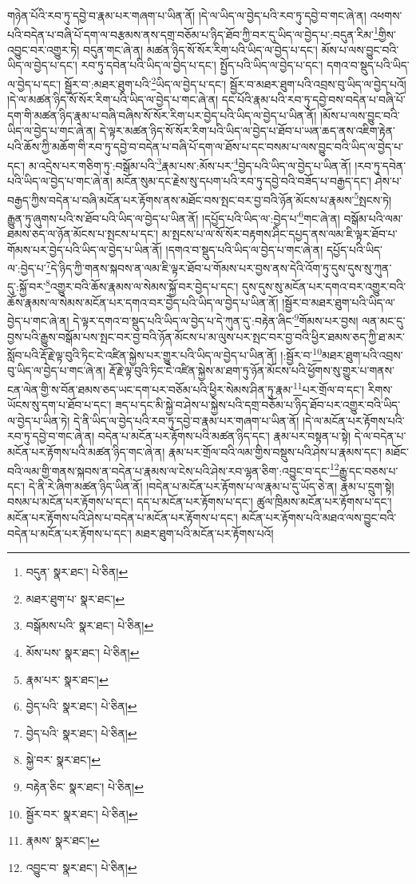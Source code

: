 གཉེན་པོའི་རབ་ཏུ་དབྱེ་བ་རྣམ་པར་གཞག་པ་ཡིན་ནོ། །དེ་ལ་ཡིད་ལ་བྱེད་པའི་རབ་ཏུ་དབྱེ་བ་གང་ཞེ་ན། འཕགས་པའི་བདེན་པ་བཞི་པོ་དག་ལ་བརྩམས་ནས་དགྲ་བཅོམ་པ་ཉིད་ཐོབ་ཀྱི་བར་དུ་ཡིད་ལ་བྱེད་པ་:བདུན་རིམ་\footnote{བདུན་  སྣར་ཐང་།  པེ་ཅིན། }གྱིས་འབྱུང་བར་འགྱུར་ཏེ། བདུན་གང་ཞེ་ན། མཚན་ཉིད་སོ་སོར་རིག་པའི་ཡིད་ལ་བྱེད་པ་དང་། མོས་པ་ལས་བྱུང་བའི་ཡིད་ལ་བྱེད་པ་དང་། རབ་ཏུ་དབེན་པའི་ཡིད་ལ་བྱེད་པ་དང་། སྤྱོད་པའི་ཡིད་ལ་བྱེད་པ་དང་། དགའ་བ་སྡུད་པའི་ཡིད་ལ་བྱེད་པ་དང་། སྦྱོར་བ་:མཐར་ཐུག་པའི་\footnote{མཐར་ཐུག་པ་  སྣར་ཐང་། }ཡིད་ལ་བྱེད་པ་དང་། སྦྱོར་བ་མཐར་ཐུག་པའི་འབྲས་བུ་ཡིད་ལ་བྱེད་པའོ། །དེ་ལ་མཚན་ཉིད་སོ་སོར་རིག་པའི་ཡིད་ལ་བྱེད་པ་གང་ཞེ་ན། དང་པོའི་རྣམ་པའི་རབ་ཏུ་དབྱེ་བས་བདེན་པ་བཞི་པོ་དག་གི་མཚན་ཉིད་རྣམ་པ་བཞི་བཞིས་སོ་སོར་རིག་པར་བྱེད་པའི་ཡིད་ལ་བྱེད་པ་ཡིན་ནོ། །མོས་པ་ལས་བྱུང་བའི་ཡིད་ལ་བྱེད་པ་གང་ཞེ་ན། དེ་ལྟར་མཚན་ཉིད་སོ་སོར་རིག་པའི་ཡིད་ལ་བྱེད་པ་ཐོབ་པ་ཡན་ཆད་ནས་འཇིག་རྟེན་པའི་ཆོས་ཀྱི་མཆོག་གི་རབ་ཏུ་དབྱེ་བ་བདེན་པ་བཞི་པོ་དག་ལ་ཐོས་པ་དང་བསམ་པ་ལས་བྱུང་བའི་ཡིད་ལ་བྱེད་པ་དང་། མ་འདྲེས་པར་གཅིག་ཏུ་:བསྒོམ་པའི་\footnote{བསྒོམས་པའི་  སྣར་ཐང་།  པེ་ཅིན། }རྣམ་པས་:མོས་པར་\footnote{མོས་པས་  སྣར་ཐང་།  པེ་ཅིན། }བྱེད་པའི་ཡིད་ལ་བྱེད་པ་ཡིན་ནོ། །རབ་ཏུ་དབེན་པའི་ཡིད་ལ་བྱེད་པ་གང་ཞེ་ན། མངོན་སུམ་དང་རྗེས་སུ་དཔག་པའི་རབ་ཏུ་དབྱེ་བའི་བཟོད་པ་བརྒྱད་དང་། ཤེས་པ་བརྒྱད་ཀྱིས་བདེན་པ་བཞི་མངོན་པར་རྟོགས་ནས་མཐོང་བས་སྤང་བར་བྱ་བའི་ཉོན་མོངས་པ་རྣམས་\footnote{རྣམ་པར་  སྣར་ཐང་། }སྤངས་ཏེ། རྒྱུན་ཏུ་ཞུགས་པའི་ས་ཐོབ་པའི་ཡིད་ལ་བྱེད་པ་ཡིན་ནོ། །དཔྱོད་པའི་ཡིད་ལ་:བྱེད་པ་\footnote{བྱེད་པའི་  སྣར་ཐང་།  པེ་ཅིན། }གང་ཞེ་ན། བསྒོམ་པའི་ལམ་ཐམས་ཅད་ལ་ཉོན་མོངས་པ་སྤངས་པ་དང་། མ་སྤངས་པ་ལ་སོ་སོར་བརྟགས་ཤིང་དཔྱད་ནས་ལམ་ཇི་ལྟར་ཐོབ་པ་གོམས་པར་བྱེད་པའི་ཡིད་ལ་བྱེད་པ་ཡིན་ནོ། །དགའ་བ་སྡུད་པའི་ཡིད་ལ་བྱེད་པ་གང་ཞེ་ན། དཔྱོད་པའི་ཡིད་ལ་:བྱེད་པ་\footnote{བྱེད་པའི་  སྣར་ཐང་།  པེ་ཅིན། }དེ་ཉིད་ཀྱི་གནས་སྐབས་ན་ལམ་ཇི་ལྟར་ཐོབ་པ་གོམས་པར་བྱས་ནས་དེའི་འོག་ཏུ་དུས་དུས་སུ་ཀུན་དུ་:སྐྱོ་བར་\footnote{སྐྱེ་བར་  སྣར་ཐང་། }འགྱུར་བའི་ཆོས་རྣམས་ལ་སེམས་སྐྱོ་བར་བྱེད་པ་དང་། དུས་དུས་སུ་མངོན་པར་དགའ་བར་འགྱུར་བའི་ཆོས་རྣམས་ལ་སེམས་མངོན་པར་དགའ་བར་བྱེད་པའི་ཡིད་ལ་བྱེད་པ་ཡིན་ནོ། །སྦྱོར་བ་མཐར་ཐུག་པའི་ཡིད་ལ་བྱེད་པ་གང་ཞེ་ན། དེ་ལྟར་དགའ་བ་སྡུད་པའི་ཡིད་ལ་བྱེད་པ་དེ་ཀུན་དུ་:བརྟེན་ཞིང་\footnote{བརྟེན་ཅིང་  སྣར་ཐང་།  པེ་ཅིན། }གོམས་པར་བྱས། ལན་མང་དུ་བྱས་པའི་རྒྱུས་བསྒོམ་པས་སྤང་བར་བྱ་བའི་ཉོན་མོངས་པ་མ་ལུས་པར་སྤང་བར་བྱ་བའི་ཕྱིར་ཐམས་ཅད་ཀྱི་ཐ་མར་སློབ་པའི་རྡོ་རྗེ་ལྟ་བུའི་ཏིང་ངེ་འཛིན་སྐྱེས་པར་གྱུར་པའི་ཡིད་ལ་བྱེད་པ་ཡིན་ནོ། །:སྦྱོར་བ་\footnote{སྦྱོར་བར་  སྣར་ཐང་།  པེ་ཅིན། }མཐར་ཐུག་པའི་འབྲས་བུ་ཡིད་ལ་བྱེད་པ་གང་ཞེ་ན། རྡོ་རྗེ་ལྟ་བུའི་ཏིང་ངེ་འཛིན་སྐྱེས་མ་ཐག་ཏུ་ཉོན་མོངས་པའི་ཕྱོགས་སུ་གྱུར་པ་གནས་ངན་ལེན་གྱི་ས་བོན་ཐམས་ཅད་ཡང་དག་པར་བཅོམ་པའི་ཕྱིར་སེམས་ཤིན་ཏུ་རྣམ་\footnote{རྣམས་  སྣར་ཐང་། }པར་གྲོལ་བ་དང་། རིགས་ཡོངས་སུ་དག་པ་ཐོབ་པ་དང་། ཟད་པ་དང་མི་སྐྱེ་བ་ཤེས་པ་སྐྱེས་པའི་དགྲ་བཅོམ་པ་ཉིད་ཐོབ་པར་འགྱུར་བའི་ཡིད་ལ་བྱེད་པ་ཡིན་ཏེ། དེ་ནི་ཡིད་ལ་བྱེད་པའི་རབ་ཏུ་དབྱེ་བ་རྣམ་པར་གཞག་པ་ཡིན་ནོ། །དེ་ལ་མངོན་པར་རྟོགས་པའི་རབ་ཏུ་དབྱེ་བ་གང་ཞེ་ན། བདེན་པ་མངོན་པར་རྟོགས་པའི་མཚན་ཉིད་དང་། རྣམ་པར་བསྟན་པ་སྟེ། དེ་ལ་བདེན་པ་མངོན་པར་རྟོགས་པའི་མཚན་ཉིད་གང་ཞེ་ན། རྣམ་པར་གྲོལ་བའི་ལམ་གྱིས་བསྡུས་པའི་ཤེས་པ་རྣམས་དང་། མཐོང་བའི་ལམ་གྱི་གནས་སྐབས་ན་བདེན་པ་རྣམས་ལ་ངེས་པའི་ཤེས་རབ་ལྷན་ཅིག་:འབྱུང་བ་དང་\footnote{འབྱུང་བ་  སྣར་ཐང་།  པེ་ཅིན། }རྒྱུ་དང་བཅས་པ་དང་། དེ་ནི་རེ་ཞིག་མཚན་ཉིད་ཡིན་ནོ། །བདེན་པ་མངོན་པར་རྟོགས་པ་ལ་རྣམ་པ་དུ་ཡོད་ཅེ་ན། རྣམ་པ་དྲུག་སྟེ། བསམ་པ་མངོན་པར་རྟོགས་པ་དང་། དད་པ་མངོན་པར་རྟོགས་པ་དང་། ཚུལ་ཁྲིམས་མངོན་པར་རྟོགས་པ་དང་། མངོན་པར་རྟོགས་པའི་ཤེས་པ་བདེན་པ་མངོན་པར་རྟོགས་པ་དང་། མངོན་པར་རྟོགས་པའི་མཐའ་ལས་བྱུང་བའི་བདེན་པ་མངོན་པར་རྟོགས་པ་དང་། མཐར་ཐུག་པའི་མངོན་པར་རྟོགས་པའོ། 